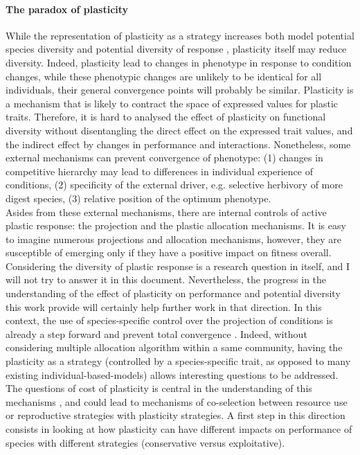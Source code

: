 \paragraph{The paradox of plasticity}

While the representation of plasticity as a strategy increases both model potential species diversity and potential diversity of response \cite{ ryser_consequences_2000, kichenin_contrasting_2013}, plasticity itself may reduce diversity. Indeed, plasticity lead to changes in phenotype in response to condition changes, while these phenotypic changes are unlikely to be identical for all individuals, their general convergence points will probably be similar. Plasticity is a mechanism that is likely to contract the space of expressed values for plastic traits. Therefore, it is hard to analysed the effect of plasticity on functional diversity without disentangling the direct effect on the expressed trait values, and the indirect effect by changes in performance and interactions. Nonetheless, some external mechanisms  can prevent convergence of phenotype: (1) changes in competitive hierarchy may lead to differences in individual experience of conditions, (2) specificity of the external driver, e.g. selective herbivory of more digest species, (3) relative position of the optimum phenotype. \\
Asides from these external mechanisms, there are internal controls of active plastic response: the projection and the plastic allocation mechanisms. It is easy to imagine numerous projections and allocation mechanisms, however, they are susceptible of emerging only if they have a positive impact on fitness overall. Considering the diversity of plastic response is a research question in itself, and I will not try to answer it in this document. Nevertheless, the progress in the understanding of the effect of plasticity on performance and potential diversity this work provide will certainly help further work in that direction. In this context, the use of species-specific control over the projection of conditions is already a step forward and prevent total convergence . Indeed, without considering multiple allocation algorithm within a same community, having the plasticity as a strategy \cite{bradshaw_unravelling_2006} (controlled by a species-specific trait, as opposed to many existing individual-based-models) allows interesting questions to be addressed. The questions of cost of plasticity is central in the understanding of this mechanisms \cite{dewitt_costs_1998, auld_re-evaluating_2009}, and could lead to mechanisms of co-selection between resource use or reproductive strategies with plasticity strategies. A first step in this direction consists in looking at how plasticity can have different impacts on performance of species with different strategies (conservative versus exploitative).



